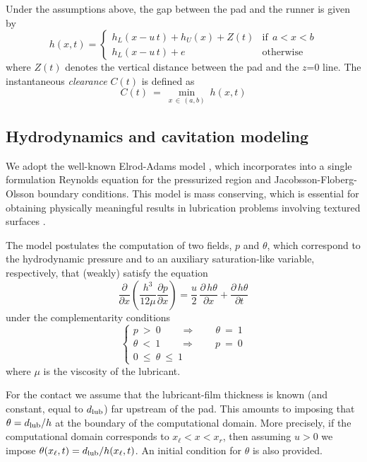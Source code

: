Under the assumptions above, the gap between the pad
and the runner is given by
\begin{equation}
h(x,t)= \left \{
\begin{array}{ll}
h_L(x-u\,t)+h_U(x)+Z(t)&\mbox{if}~~a < x < b\\
h_L(x-u\,t)+e& \mbox{otherwise}
\end{array} \right.
\end{equation}
where $Z(t)$ denotes the vertical distance between the pad and the
$z$=0 line. The instantaneous {\em clearance} $C(t)$ is defined as
$$
C(t) ~=~ \min_{x\,\in\,(a,b)} ~h(x,t)
$$

\subsection{Hydrodynamics and cavitation modeling}

We adopt the well-known Elrod-Adams model \cite{elrod1}, which
incorporates into a single formulation Reynolds equation for the
pressurized region and Jacobsson-Floberg-Olsson boundary conditions.
This model is mass conserving, which  
is essential for obtaining physically meaningful results
in lubrication problems involving textured surfaces \cite{ausas07}.


The model postulates the computation of two fields, $p$ and $\theta$,
which correspond to the hydrodynamic pressure and to an auxiliary
saturation-like variable, respectively, that (weakly) satisfy the equation
\begin{equation}
\frac{\partial }{\partial x} \left ( \frac{h^3}{12 \mu} \frac{\partial p}{\partial x}\right ) =  
 \frac{u}{2} \,\frac{\partial\, h\theta}{\partial x} + 
 \frac{\partial\, h\theta}{\partial t}
\label{eqpthetadim}
\end{equation}
under the complementarity conditions
\begin{equation}
\left \{
\begin{array}{l}
p~>~0 \qquad \Rightarrow \qquad \theta~ =~ 1 \\
\theta~<~1\qquad \Rightarrow \qquad p~=~0\\
0~\leq~\theta~\leq~1
\end{array}
\right.
\end{equation}
where $\mu$ is the viscosity of the lubricant. 

For the  contact we assume that the
lubricant-film thickness is known 
(and constant, equal to $d_{\mbox{\scriptsize lub}}$)
far upstream of the pad. This amounts to imposing
that $\theta = d_{\mbox{\scriptsize lub}}/h$ at the boundary of
the computational domain. More precisely, if the computational
domain corresponds to $x_\ell < x < x_r$, then assuming $u>0$
we impose $\theta(x_\ell,t) = d_{\mbox{\scriptsize lub}}/h(x_\ell,t)$.
An initial condition for $\theta$ is also provided.

